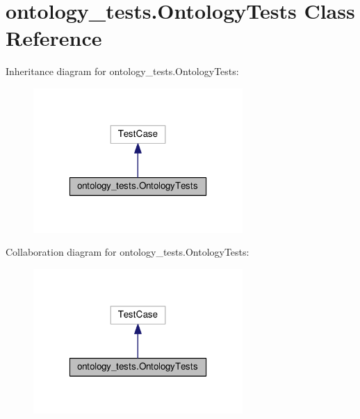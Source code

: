 \hypertarget{classontology__tests_1_1OntologyTests}{\section{ontology\-\_\-tests.\-Ontology\-Tests Class Reference}
\label{classontology__tests_1_1OntologyTests}
}


Inheritance diagram for ontology\-\_\-tests.\-Ontology\-Tests\-:
\nopagebreak
\begin{figure}[H]
\begin{center}
\leavevmode
\includegraphics[width=226pt]{classontology__tests_1_1OntologyTests__inherit__graph}
\end{center}
\end{figure}


Collaboration diagram for ontology\-\_\-tests.\-Ontology\-Tests\-:
\nopagebreak
\begin{figure}[H]
\begin{center}
\leavevmode
\includegraphics[width=226pt]{classontology__tests_1_1OntologyTests__coll__graph}
\end{center}
\end{figure}
